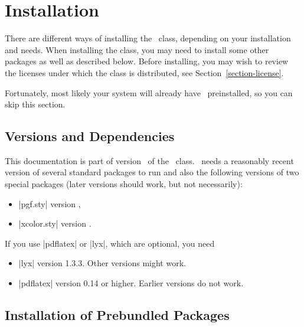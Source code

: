 %
%
%


\section{Installation}

\label{section-installation}

There are different ways of installing the \beamer\ class, depending
on your installation and needs. When installing the class, you may
need to install some other packages as well as described below. Before
installing, you may wish to review the licenses under
which the class is distributed, see Section~\ref{section-license}.

Fortunately, most likely your system will already have \beamer\
preinstalled, so you can skip this section.


\subsection{Versions and Dependencies}

This documentation is part of version \version\ of the \beamer\
class. \beamer\ needs a reasonably recent version of several standard
packages to run and also the following versions of two special
packages (later versions should work, but not necessarily):
\begin{itemize}
\item
  |pgf.sty| version \pgfversion,
\item
  |xcolor.sty| version \xcolorversion.
\end{itemize}

If you use |pdflatex| or |lyx|, which are optional, you need
\begin{itemize}
\item
  |lyx| version 1.3.3. Other versions might work.
\item
  |pdflatex| version 0.14 or higher. Earlier versions do not work.
\end{itemize}



\subsection{Installation of Prebundled Packages}

